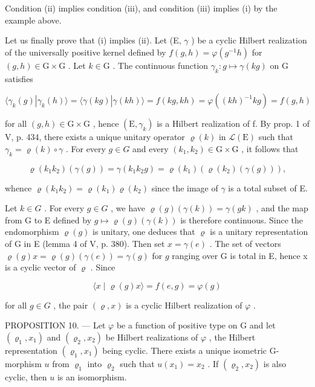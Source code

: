 Condition (ii) implies condition (iii), and condition (iii) implies (i) by the example above.

Let us finally prove that (i) implies (ii). Let (E, \(\gamma\) ) be a cyclic Hilbert realization of the universally positive kernel defined by \(f(g,h)=\varphi(g^{-1}h)\) for \((g,h)\in\mathrm{G}\times\mathrm{G}\) . Let \(k\in\mathrm{G}\) . The continuous function \(\gamma_{k}:g\mapsto\gamma(kg)\) on G satisfies

\[
\langle \gamma_ {k} (g) | \gamma_ {k} (h) \rangle = \langle \gamma (k g) | \gamma (k h) \rangle = f (k g, k h) = \varphi ((k h) ^ {- 1} k g) = f (g, h)
\]

for all \((g,h)\in\mathrm{G}\times\mathrm{G}\) , hence \((\mathrm{E},\gamma_{k})\) is a Hilbert realization of f. By prop. 1 of V, p. 434, there exists a unique unitary operator \(\varrho(k)\) in \(\mathcal{L}(\mathrm{E})\) such that \(\gamma_{k}=\varrho(k)\circ\gamma\) . For every \(g\in G\) and every \((k_{1},k_{2})\in\mathrm{G}\times\mathrm{G}\) , it follows that

\[
\varrho (k _ {1} k _ {2}) (\gamma (g)) = \gamma (k _ {1} k _ {2} g) = \varrho (k _ {1}) (\varrho (k _ {2}) (\gamma (g))),
\]

whence \(\varrho(k_1k_2) = \varrho(k_1)\varrho(k_2)\) since the image of \(\gamma\) is a total subset of E.

Let \(k \in G\) . For every \(g \in G\) , we have \(\varrho(g)(\gamma(k)) = \gamma(gk)\) , and the map from G to E defined by \(g \mapsto \varrho(g)(\gamma(k))\) is therefore continuous. Since the endomorphism \(\varrho(g)\) is unitary, one deduces that \(\varrho\) is a unitary representation of G in E (lemma 4 of V, p. 380). Then set \(x = \gamma(e)\) . The set of vectors \(\varrho(g)x = \varrho(g)(\gamma(e)) = \gamma(g)\) for \(g\) ranging over G is total in E, hence x is a cyclic vector of \(\varrho\) . Since

\[
\langle x \mid \varrho (g) x \rangle = f (e, g) = \varphi (g)
\]

for all \(g \in G\) , the pair \((\varrho, x)\) is a cyclic Hilbert realization of \(\varphi\) .

PROPOSITION 10. — Let \(\varphi\) be a function of positive type on G and let \((\varrho_{1}, x_{1})\) and \((\varrho_{2}, x_{2})\) be Hilbert realizations of \(\varphi\) , the Hilbert representation \((\varrho_{1}, x_{1})\) being cyclic. There exists a unique isometric G-morphism \(u\) from \(\varrho_{1}\) into \(\varrho_{2}\) such that \(u(x_{1}) = x_{2}\) . If \((\varrho_{2}, x_{2})\) is also cyclic, then \(u\) is an isomorphism.

